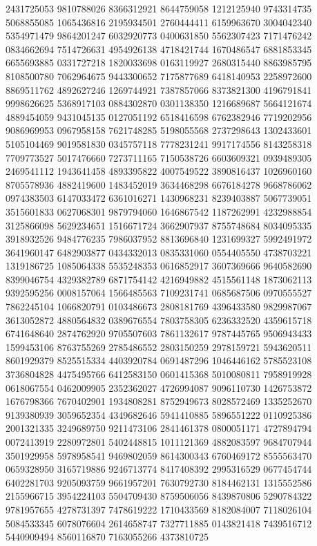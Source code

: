 {{2431725053 9810788026 8366312921 8644759058 1212125940 9743314735 5068855085
1065436816 2195934501 2760444411 6159963670 3004042340 5354971479 9864201247
6032920773 0400631850 5562307423 7171476242 0834662694 7514726631 4954926138
4718421744 1670486547 6881853345 6655693885 0331727218 1820033698 0163119927
2680315440 8863985795 8108500780 7062964675 9443300652 7175877689 6418140953
2258972600 8869511762 4892627246 1269744921 7387857066 8373821300 4196791841
9998626625 5368917103 0884302870 0301138350 1216689687 5664121674 4889454059
9431045135 0127051192 6518416598 6762382946 7719202956 9086969953 0967958158
7621748285 5198055568 2737298643 1302433601 5105104469 9019581830 0345757118
7778231241 9917174556 8143258318 7709773527 5017476660 7273711165 7150538726
6603609321 0939489305 2469541112 1943641458 4893395822 4007549522 3890816437
1026960160 8705578936 4882419600 1483452019 3634468298 6676184278 9668786062
0974383503 6147033472 6361016271 1430968231 8239403887 5067739051 3515601833
0627068301 9879794060 1646867542 1187262991 4232988854 3125866098 5629234651
1516671724 3662907937 8755748684 8034095335 3918932526 9484776235 7986037952
8813696840 1231699327 5992491972 3641960147 6482903877 0434332013 0835331060
0554405550 4738703221 1319186725 1085064338 5535248353 0616852917 3607369666
9640582690 8399046754 4329382789 6871754142 4216949882 4515561148 1873062113
9392595256 0008157064 1566485563 7109231741 0685687506 0970555527 7862245104
1066820791 0103486673 2808181769 4396433580 9829987067 3613052872 4880564832
0389676554 7803758305 6236332520 4359615718 6741648640 2874762920 9705507603
7861132617 9787445765 9506943433 1599453106 8763755269 2785486552 2803150259
2978159721 5943620511 8601929379 8525515334 4403920784 0691487296 1046446162
5785523108 3736804828 4475495766 6412583150 0601415368 5010080811 7958919928
0618067554 0462009905 2352362027 4726994087 9096110730 1426753872 1676798366
7670402901 1934808281 8752949673 8028572469 1335252670 9139380939 3059652354
4349682646 5941410885 5896551222 0110925386 2001321335 3249689750 9211473106
2841461378 0800051171 4727894794 0072413919 2280972801 5402448815 1011121369
4882083597 9684707944 3501929958 5978958541 9469802059 8614300343 6760469172
8555563470 0659328950 3165719886 9246713774 8417408392 2995316529 0677454744
6402281703 9205093759 9661957201 7630792730 8184462131 1315552586 2155966715
3954224103 5504709430 8759506056 8439870806 5290784322 9781957655 4278731397
7478619222 1710433569 8182084007 7118026104 5084533345 6078076604 2614658747
7327711885 0143821418 7439516712 5440909494 8560116870 7163055266 4373810725
}}
